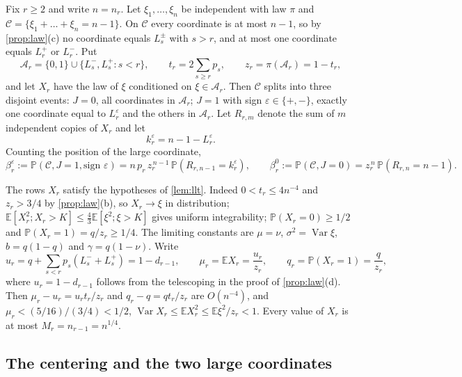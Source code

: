 \documentclass[11pt]{amsart}
\theoremstyle{definition}
\newcommand{\E}{\mathbb{E}}
\newcommand{\Prob}{\mathbb{P}}
\newcommand{\Cond}{\mathcal{C}}
\DeclareMathOperator{\Var}{Var}
\begin{document}
Fix $r\ge2$ and write $n=n_r$. Let $\xi_1,\dots,\xi_n$ be independent with law $\pi$ and $\Cond=\{\xi_1+\dots+\xi_n=n-1\}$. On $\Cond$ every coordinate is at most $n-1$, so by \cref{prop:law}(c) no coordinate equals $L_s^\pm$ with $s>r$, and at most one coordinate equals $L_r^+$ or $L_r^-$. Put
\[
\mathcal A_r=\{0,1\}\cup\{L_s^-,L_s^+:s<r\},\qquad t_r=2\sum_{s\ge r}p_s,\qquad z_r=\pi(\mathcal A_r)=1-t_r,
\]
and let $X_r$ have the law of $\xi$ conditioned on $\xi\in\mathcal A_r$. Then $\Cond$ splits into three disjoint events: $J=0$, all coordinates in $\mathcal A_r$; $J=1$ with sign $\varepsilon\in\{+,-\}$, exactly one coordinate equal to $L_r^\varepsilon$ and the others in $\mathcal A_r$. Let $R_{r,m}$ denote the sum of $m$ independent copies of $X_r$ and let
\[
k_r^\varepsilon=n-1-L_r^\varepsilon .
\]
Counting the position of the large coordinate,
\begin{equation}\label{eq:beta}
\beta_r^\varepsilon:=\Prob(\Cond,J=1,\text{sign }\varepsilon)=n\,p_r\,z_r^{\,n-1}\,\Prob(R_{r,n-1}=k_r^\varepsilon),
\qquad
\beta_r^0:=\Prob(\Cond,J=0)=z_r^{\,n}\,\Prob(R_{r,n}=n-1).
\end{equation}

The rows $X_r$ satisfy the hypotheses of \cref{lem:llt}. Indeed $0<t_r\le4n^{-4}$ and $z_r>3/4$ by \cref{prop:law}(b), so $X_r\to\xi$ in distribution; $\E[X_r^2;X_r>K]\le\tfrac43\E[\xi^2;\xi>K]$ gives uniform integrability; $\Prob(X_r=0)\ge1/2$ and $\Prob(X_r=1)=q/z_r\ge1/4$. The limiting constants are $\mu=\nu$, $\sigma^2=\Var\xi$, $b=q(1-q)$ and $\gamma=q(1-\nu)$. Write
\begin{equation}\label{eq:rowmeans}
u_r=q+\sum_{s<r}p_s(L_s^-+L_s^+)=1-d_{r-1},\qquad
\mu_r=\E X_r=\frac{u_r}{z_r},\qquad
q_r=\Prob(X_r=1)=\frac q{z_r},
\end{equation}
where $u_r=1-d_{r-1}$ follows from the telescoping in the proof of \cref{prop:law}(d). Then $\mu_r-u_r=u_rt_r/z_r$ and $q_r-q=qt_r/z_r$ are $O(n^{-4})$, and $\mu_r<(5/16)/(3/4)<1/2$, $\Var X_r\le\E X_r^2\le\E\xi^2/z_r<1$. Every value of $X_r$ is at most $M_r=n_{r-1}=n^{1/4}$.

\subsection{The centering and the two large coordinates}
\end{document}
